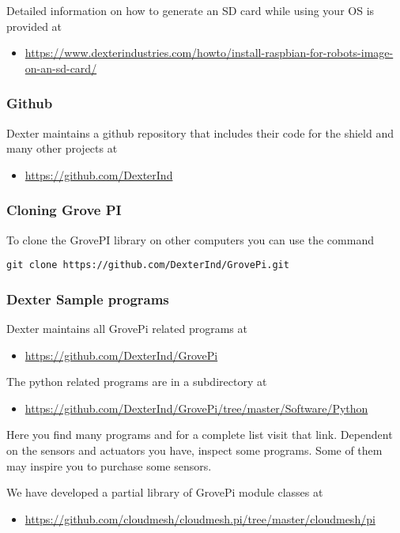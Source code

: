 Detailed information on how to generate an SD card while using your OS
is provided at

\begin{itemize}
\tightlist
\item
  \url{https://www.dexterindustries.com/howto/install-raspbian-for-robots-image-on-an-sd-card/}
\end{itemize}

\subsubsection{Github}\label{github}

Dexter maintains a github repository that includes their code for the
shield and many other projects at

\begin{itemize}
\tightlist
\item
  \url{https://github.com/DexterInd}
\end{itemize}

\subsubsection{Cloning Grove PI}\label{cloning-grove-pi}

To clone the GrovePI library on other computers you can use the command

\begin{verbatim}
git clone https://github.com/DexterInd/GrovePi.git
\end{verbatim}

\subsubsection{Dexter Sample programs}\label{dexter-sample-programs}

Dexter maintains all GrovePi related programs at

\begin{itemize}
\tightlist
\item
  \url{https://github.com/DexterInd/GrovePi}
\end{itemize}

The python related programs are in a subdirectory at

\begin{itemize}
\tightlist
\item
  \url{https://github.com/DexterInd/GrovePi/tree/master/Software/Python}
\end{itemize}

Here you find many programs and for a complete list visit that link.
Dependent on the sensors and actuators you have, inspect some programs.
Some of them may inspire you to purchase some sensors.

We have developed a partial library of GrovePi module classes at

\begin{itemize}
\tightlist
\item
  \url{https://github.com/cloudmesh/cloudmesh.pi/tree/master/cloudmesh/pi}
\end{itemize}
